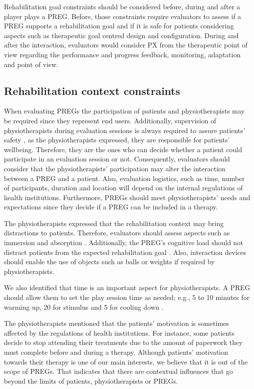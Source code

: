 Rehabilitation goal constraints should be considered before, during and after a player plays a \ac{PREG}. Before, those constraints require evaluators to assess if a \ac{PREG} supports a rehabilitation goal and if it is safe for patients considering aspects such as therapeutic goal centred design and configuration. During and after the interaction, evaluators would consider \ac{PX} from the therapeutic point of view regarding the performance and progress feedback, monitoring, adaptation and point of view.

\subsection{Rehabilitation context constraints}
When evaluating \acp{PREG} the participation of patients and physiotherapists may be required since they represent end users. Additionally, supervision of physiotherapists during evaluation sessions is always required to assure patients' safety \autocite{Wiemeyer2015}, as the physiotherapists expressed, they are responsible for patients' wellbeing. Therefore, they are the ones who can decide whether a patient could participate in an evaluation session or not. Consequently, evaluators should consider that the physiotherapists' participation may alter the interaction between a \ac{PREG} and a patient.  Also, evaluation logistics, such as time, number of participants, duration and location will depend on the internal regulations of health institutions. Furthermore, \acp{PREG} should meet physiotherapists' needs and expectations since they decide if a \ac{PREG} can be included in a therapy.

The physiotherapists expressed that the rehabilitation context may bring distractions to patients. Therefore, evaluators should assess aspects such as immersion and absorption \autocite{Lapas2015}. Additionally, the \ac{PREG}'s cognitive load should not distract patients from the expected rehabilitation goal \autocite{Isbister2015,Sinclair2007}. Also, interaction devices should enable the use of objects such as balls or weights if required by physiotherapists.

We also identified that time is an important aspect for physiotherapists. A \ac{PREG} should allow them to set the play session time as needed; e.g., 5 to 10 minutes for warming up, 20 for stimulus and 5 for cooling down \autocite{Sinclair2007}.

The physiotherapists mentioned that the patients' motivation is sometimes affected by the regulations of health institutions. For instance, some patients decide to stop attending their treatments due to the amount of paperwork they must complete before and during a therapy. Although patients' motivation towards their therapy is one of our main interests, we believe that it is out of the scope of \acp{PREG}. That indicates that there are contextual influences that go beyond the limits of patients, physiotherapists or \acp{PREG}.

